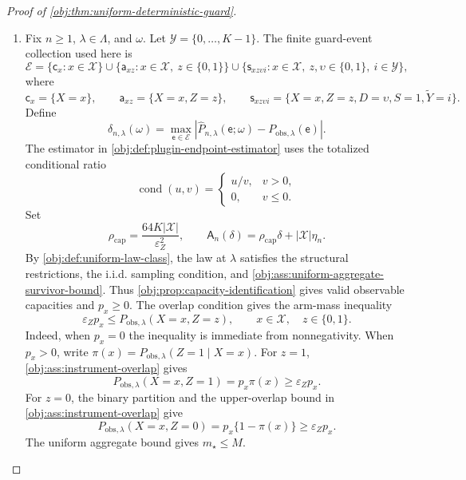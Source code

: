 \begin{proof}[Proof of \cref{obj:thm:uniform-deterministic-guard}]
\begin{enumerate}
\item Fix \(n\ge 1\), \(\lambda\in\Lambda\), and \(\omega\).  Let
\(\mathcal Y=\{0,\ldots,K-1\}\).  The finite guard-event collection used here is
\[
\mathcal E
=
\{\mathsf c_x:x\in\mathcal X\}
\cup
\{\mathsf a_{xz}:x\in\mathcal X,\ z\in\{0,1\}\}
\cup
\{\mathsf s_{xz\upsilon i}:x\in\mathcal X,\ z,\upsilon\in\{0,1\},\ i\in\mathcal Y\},
\]
where
\[
\mathsf c_x=\{X=x\},
\qquad
\mathsf a_{xz}=\{X=x,Z=z\},
\qquad
\mathsf s_{xz\upsilon i}=\{X=x,Z=z,D=\upsilon,S=1,\widetilde Y=i\}.
\]
Define
\[
\delta_{n,\lambda}(\omega)
=
\max_{\mathsf e\in\mathcal E}
\left|
\widehat P_{n,\lambda}(\mathsf e;\omega)
-
P_{\mathrm{obs},\lambda}(\mathsf e)
\right|.
\]
The estimator in \cref{obj:def:plugin-endpoint-estimator} uses the totalized
conditional ratio
\[
\operatorname{cond}(u,v)=
\begin{cases}
u/v, & v>0,\\
0, & v\le 0.
\end{cases}
\]
Set
\[
\rho_{\mathrm{cap}}
=
\frac{64K|\mathcal X|}{\varepsilon_Z^2},
\qquad
\mathsf A_n(\delta)
=
\rho_{\mathrm{cap}}\delta+|\mathcal X|\eta_n .
\]
By \cref{obj:def:uniform-law-class}, the law at \(\lambda\) satisfies the
structural restrictions, the i.i.d. sampling condition, and
\cref{obj:ass:uniform-aggregate-survivor-bound}.  Thus
\cref{obj:prop:capacity-identification} gives valid observable capacities and
\(p_x\ge0\).  The overlap condition gives the arm-mass inequality
\[
\varepsilon_Z p_x
\le
P_{\mathrm{obs},\lambda}(X=x,Z=z),
\qquad x\in\mathcal X,
\quad z\in\{0,1\}.
\]
Indeed, when \(p_x=0\) the inequality is immediate from nonnegativity.  When
\(p_x>0\), write
\(\pi(x)=P_{\mathrm{obs},\lambda}(Z=1\mid X=x)\).  For \(z=1\),
\cref{obj:ass:instrument-overlap} gives
\[
P_{\mathrm{obs},\lambda}(X=x,Z=1)
=
 p_x\pi(x)
\ge
\varepsilon_Zp_x .
\]
For \(z=0\), the binary partition and the upper-overlap bound in
\cref{obj:ass:instrument-overlap} give
\[
P_{\mathrm{obs},\lambda}(X=x,Z=0)
=
 p_x\{1-\pi(x)\}
\ge
\varepsilon_Zp_x .
\]
The uniform aggregate bound gives \(m_\star\le M\).


\end{enumerate}
\end{proof}
